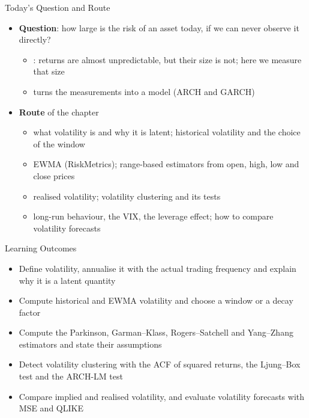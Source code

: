 \begin{frame}{Today's Question and Route}
\itemsize{\small}
\begin{itemize}
    \item \textbf{Question}: how large is the risk of an asset today, if we can never observe it directly?
    \begin{itemize}
        \item {}: returns are almost unpredictable, but their size is not; here we measure that size
        \item {} turns the measurements into a model (ARCH and GARCH)
    \end{itemize}
    \item \textbf{Route} of the chapter
    \begin{itemize}
        \item what volatility is and why it is latent; historical volatility and the choice of the window
        \item EWMA (RiskMetrics); range-based estimators from open, high, low and close prices
        \item realised volatility; volatility clustering and its tests
        \item long-run behaviour, the VIX, the leverage effect; how to compare volatility forecasts
    \end{itemize}
\end{itemize}
\end{frame}

\begin{frame}{Learning Outcomes}
\itemsize{\small}
\begin{itemize}
    \item Define volatility, annualise it with the actual trading frequency and explain why it is a latent quantity
    \item Compute historical and EWMA volatility and choose a window or a decay factor
    \item Compute the Parkinson, Garman--Klass, Rogers--Satchell and Yang--Zhang estimators and state their assumptions
    \item Detect volatility clustering with the ACF of squared returns, the Ljung--Box test and the ARCH-LM test
    \item Compare implied and realised volatility, and evaluate volatility forecasts with MSE and QLIKE
\end{itemize}
\end{frame}


